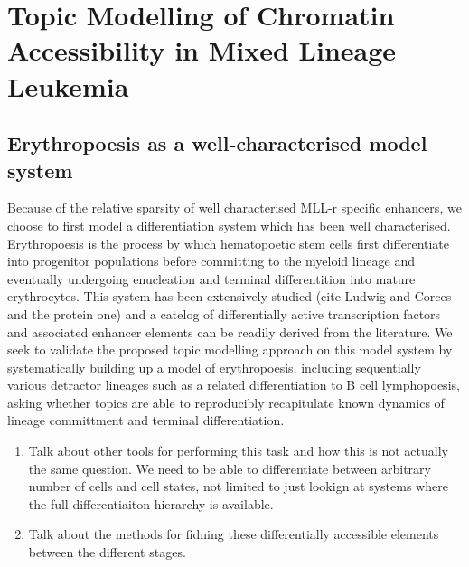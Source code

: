 

\chapter{\label{ch:1-intro} Topic Modelling of Chromatin Accessibility in Mixed Lineage Leukemia} 

\minitoc

\section{Erythropoesis as a well-characterised model system}

Because of the relative sparsity of well characterised MLL-r specific enhancers, we choose to first model a differentiation system which has been well characterised. Erythropoesis is the process by which hematopoetic stem cells first differentiate into progenitor populations before committing to the myeloid lineage and eventually undergoing enucleation and terminal differentition into mature erythrocytes. This system has been extensively studied (cite Ludwig and Corces and the protein one) and a catelog of differentially active transcription factors and associated enhancer elements can be readily derived from the literature. We seek to validate the proposed topic modelling approach on this model system by systematically building up a model of erythropoesis, including sequentially various detractor lineages such as a related differentiation to B cell lymphopoesis, asking whether topics are able to reproducibly recapitulate known dynamics of lineage committment and terminal differentiation. 


\begin{enumerate}
    \item Talk about other tools for performing this task and how this is not actually the same question. We need to be able to differentiate between arbitrary number of cells and cell states, not limited to just lookign at systems where the full differentiaiton hierarchy is available. 
    \item Talk about the methods for fidning these differentially accessible elements between the different stages. 
\end{enumerate}



